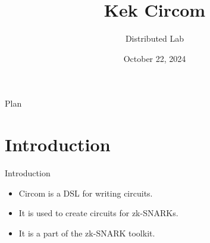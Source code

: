 \documentclass{zkdl-presentation-template}
\title[Circom]{\textbf{Kek Circom}}
\author{Distributed Lab}
\date{October 22, 2024}
\begin{document}

    \begin{frame}{Plan}
        \tableofcontents
    \end{frame}

    \section{Introduction}
    \begin{frame}{Introduction}
        \begin{itemize}
            \item Circom is a DSL for writing circuits.
            \item It is used to create circuits for zk-SNARKs.
            \item It is a part of the zk-SNARK toolkit.
        \end{itemize}
    \end{frame}
\end{document}
